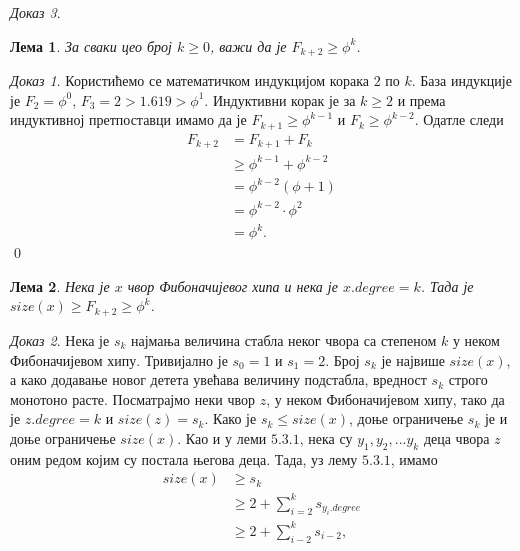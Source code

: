 \documentclass[11pt, a4paper]{article}
\newtheorem{lema}{\selectlanguage{russian} Лема} [subsection]
\theoremstyle{remark}
\newtheorem*{dokaz}{\selectlanguage{russian} Доказ}
\numberwithin{equation}{section}
\begin{document}
\begin{dokaz}
	\begin{lema}
		\normalfont
		За сваки цео број $k \geq 0$, важи да је $F_{k+2} \geq \phi^{k}$.
	\end{lema}

	\begin{dokaz}
		Користићемо се математичком индукцијом корака $2$ по $k$. База индукције је $F_2=\phi^{0}$, $F_3=2>1.619>\phi^{1}$. Индуктивни корак је за $k \geq 2$ и према индуктивној претпоставци имамо да је $F_{k+1} \geq \phi^{k-1}$ и $F_{k} \geq \phi^{k-2}$. Одатле следи		
		\begin{equation}
		\begin{split}
			F_{k+2} &= F_{k+1}+F_k \\
			& \geq \phi^{k-1}+\phi^{k-2} \\
			&= \phi^{k-2}(\phi+1) \\
			&= \phi^{k-2} \cdot \phi^{2} \\
			&= \phi^{k}.
		\end{split}
		\end{equation}
		\qed
	\end{dokaz}

	\begin{lema}
		\normalfont
		Нека је $x$ чвор Фибоначијевог хипа и нека је $x.degree=k$. Тада је \mbox{$size(x) \geq F_{k+2} \geq \phi^{k}$}.
	\end{lema}

	\begin{dokaz}
		Нека је $s_k$ најмања величина стабла неког чвора са степеном $k$ у неком Фибоначијевом хипу. Тривијално је $s_0=1$ и $s_1=2$. Број $s_k$ је највише $size(x)$, а како додавање новог детета увећава величину подстабла, вредност $s_k$ строго монотоно расте. Посматрајмо неки чвор $z$, у неком Фибоначијевом хипу, тако да је $z.degree=k$ и $size(z)=s_k$. Како је $s_k \leq size(x)$, доње ограничење $s_k$ је и доње ограничење $size(x)$. Као и у леми $5.3.1$, нека су $y_1, y_2, ...y_k$ деца чвора $z$ оним редом којим су постала његова деца. Тада, уз лему $5.3.1$, имамо
		\begin{equation}
			\begin{split}
			size(x) & \geq s_k \\
			& \geq 2+\sum_{i=2}^{k}s_{y_i .degree} \\
			& \geq 2+ \sum_{i-2}^{k}s_{i-2},
			\end{split}
		\end{equation}
		

\end{dokaz}
\end{dokaz}
\end{document}
